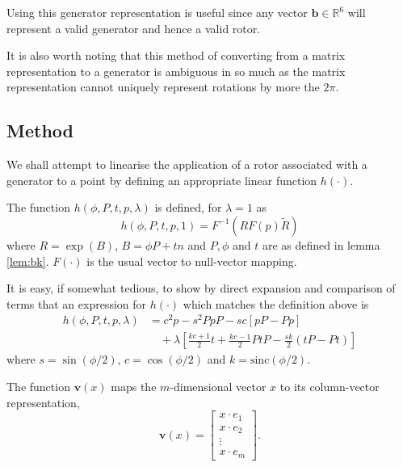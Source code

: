 Using this generator representation is useful since any vector
$\mathbf{b} \in {\mathbb R}^6$ will represent a valid generator and
hence a valid rotor.


It is also worth noting that this method of converting from a matrix
representation to a generator is ambiguous in so much as the matrix representation
cannot uniquely represent rotations by more the $2\pi$.

\subsection{Method}

We shall attempt to linearise the application of a rotor associated
with a generator to a point by defining an appropriate linear function
$h(\cdot)$.

\begin{definition}
The function $h(\phi, P, t, p, \lambda)$ is defined, for $\lambda = 1$ as
\[
h(\phi, P, t, p, 1) = F^{-1} \left( R F(p) \tilde{R} \right)
\]
where $R = \exp(B)$, $B = \phi P+tn$ and $P, \phi$ and $t$ are
as defined in lemma \ref{lem:bk}. $F(\cdot)$ is the usual vector 
to null-vector mapping.
\end{definition}

It is easy, if somewhat tedious, to show by direct expansion and comparison of terms that
an expression for $h(\cdot)$ which matches the definition above is
\begin{align}
h(\phi, P, t, p, \lambda) &=c^2p - s^2PpP - sc\left[pP - Pp\right] \nonumber \\
&\quad+ \lambda\left[ 
 \frac{kc+1}{2} t + \frac{kc-1}{2} PtP
- \frac{sk}{2} (tP - Pt)
\right] \label{eqn:defn}
\end{align}
where $s = \sin(\phi/2)$, $c = \cos(\phi/2)$ and $k = \textrm{sinc}(\phi/2)$.

\begin{definition}
The function $\mathbf{v}(x)$ maps the $m$-dimensional vector $x$ to its column-vector
representation,
\[
\mathbf{v}(x) = \left[
\begin{array}{c}
x \cdot e_1 \\ x \cdot e_2 \\ \vdots \\ x \cdot e_m
\end{array} 
\right].
\]
\end{definition}

